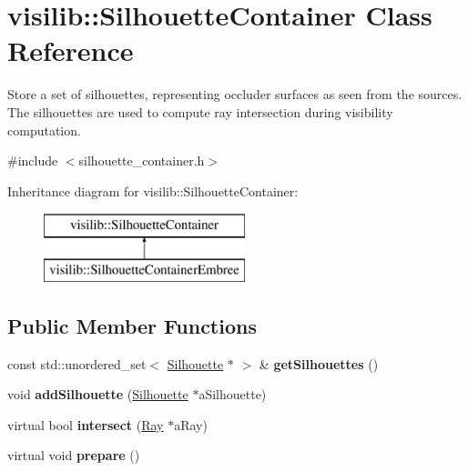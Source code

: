 \hypertarget{classvisilib_1_1_silhouette_container}{}\section{visilib\+::Silhouette\+Container Class Reference}
\label{classvisilib_1_1_silhouette_container}


Store a set of silhouettes, representing occluder surfaces as seen from the sources. The silhouettes are used to compute ray intersection during visibility computation.  




{\ttfamily \#include $<$silhouette\+\_\+container.\+h$>$}

Inheritance diagram for visilib\+::Silhouette\+Container\+:\begin{figure}[H]
\begin{center}
\leavevmode
\includegraphics[height=2.000000cm]{classvisilib_1_1_silhouette_container}
\end{center}
\end{figure}
\subsection*{Public Member Functions}
\begin{DoxyCompactItemize}
\item 
\mbox{\label{classvisilib_1_1_silhouette_container_a7c42eff193b69bd62532c1b723700901}} 
const std\+::unordered\+\_\+set$<$ \mbox{\hyperlink{classvisilib_1_1_silhouette}{Silhouette}} $\ast$ $>$ \& {\bfseries get\+Silhouettes} ()
\item 
\mbox{\label{classvisilib_1_1_silhouette_container_a5a9047d08292878caf0d4cea6107122f}} 
void {\bfseries add\+Silhouette} (\mbox{\hyperlink{classvisilib_1_1_silhouette}{Silhouette}} $\ast$a\+Silhouette)
\item 
\mbox{\label{classvisilib_1_1_silhouette_container_a45fe6f13c65d91a7f500bb47f3a6cb34}} 
virtual bool {\bfseries intersect} (\mbox{\hyperlink{structvisilib_1_1_ray}{Ray}} $\ast$a\+Ray)
\item 
\mbox{\label{classvisilib_1_1_silhouette_container_a83c0a6a3517e09446d8f145a3f58eda7}} 
virtual void {\bfseries prepare} ()
\end{DoxyCompactItemize}
